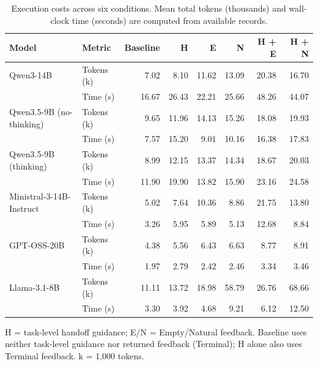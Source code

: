 \begin{table}[t]
\centering
\setlength{\belowcaptionskip}{4pt}
\caption{Execution costs across six conditions. Mean total tokens
(thousands) and wall-clock time (seconds) are computed from available records.}
\label{tab:execution-cost}
\small
\setlength{\tabcolsep}{3.5pt}
\renewcommand{\arraystretch}{1.05}
\begin{tabular}{@{}llrrrrrr@{}}
\toprule
\textbf{Model} & \textbf{Metric} & \textbf{Baseline} & \textbf{H}
& \textbf{E} & \textbf{N} & \textbf{H + E} & \textbf{H + N} \\
\midrule
Qwen3-14B & Tokens (k) & 7.02 & 8.10 & 11.62 & 13.09 & 20.38 & 16.70 \\
 & Time (s) & 16.67 & 26.43 & 22.21 & 25.66 & 48.26 & 44.07 \\
\addlinespace[3pt]
Qwen3.5-9B (no-thinking) & Tokens (k) & 9.65 & 11.96 & 14.13 & 15.26 & 18.08 & 19.93 \\
 & Time (s) & 7.57 & 15.20 & 9.01 & 10.16 & 16.38 & 17.83 \\
\addlinespace[3pt]
Qwen3.5-9B (thinking) & Tokens (k) & 8.99 & 12.15 & 13.37 & 14.34 & 18.67 & 20.03 \\
 & Time (s) & 11.90 & 19.90 & 13.82 & 15.90 & 23.16 & 24.58 \\
\addlinespace[3pt]
Ministral-3-14B-Instruct & Tokens (k) & 5.02 & 7.64 & 10.36 & 8.86 & 21.75 & 13.80 \\
 & Time (s) & 3.26 & 5.95 & 5.89 & 5.13 & 12.68 & 8.84 \\
\addlinespace[3pt]
GPT-OSS-20B & Tokens (k) & 4.38 & 5.56 & 6.43 & 6.63 & 8.77 & 8.91 \\
 & Time (s) & 1.97 & 2.79 & 2.42 & 2.46 & 3.34 & 3.46 \\
\addlinespace[3pt]
Llama-3.1-8B & Tokens (k) & 11.11 & 13.72 & 18.98 & 58.79 & 26.76 & 68.66 \\
 & Time (s) & 3.30 & 3.92 & 4.68 & 9.21 & 6.12 & 12.50 \\
\bottomrule
\end{tabular}
\par\smallskip
{\footnotesize
H = task-level handoff guidance; E/N = Empty/Natural feedback.
Baseline uses neither task-level guidance nor returned feedback (Terminal);
H alone also uses Terminal feedback. k = 1,000 tokens.\par}
\end{table}
